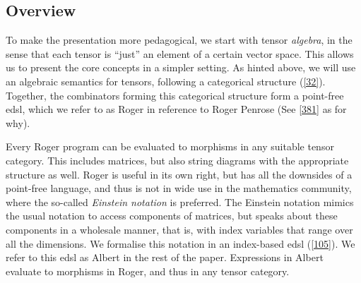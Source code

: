 \documentclass[nolinenum]{jfp}
\begin{document}
\subsection{Overview}\label{1} 
To make the presentation more pedagogical, we start with tensor
\emph{algebra}, in the sense that each tensor is ``just'' an element of a
certain vector space. This allows us to present the core concepts in a
simpler setting.
As hinted above, we will use an algebraic semantics for tensors,
following a categorical structure (\cref{32}). Together, the combinators
forming this categorical structure form a point-free {\sc{}edsl}, which we
refer to as {\sc{}Roger} in reference to Roger Penrose (See \cref{381} as for why).

Every {\sc{}Roger} program can be evaluated to morphisms in any suitable
tensor category. This includes matrices, but also string diagrams with
the appropriate structure as well.  {\sc{}Roger} is useful in its own right,
but has all the downsides of a point-free language, and thus is not in
wide use in the mathematics community, where the so-called \emph{Einstein notation} is
preferred.  The Einstein notation mimics the usual notation to access
components of matrices, but speaks about these components in a
wholesale manner, that is, with index variables that range over all
the dimensions. We formalise this notation in an index-based {\sc{}edsl} (\cref{105}).  We refer to this {\sc{}edsl} as {\sc{}Albert} in the rest of the
paper.  Expressions in {\sc{}Albert} evaluate to morphisms in {\sc{}Roger}, and
thus in any tensor category.
\end{document}
